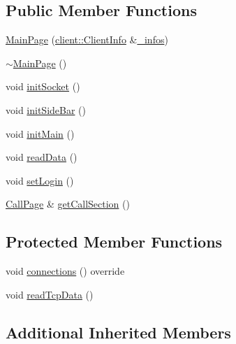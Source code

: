 \subsection*{Public Member Functions}
\begin{DoxyCompactItemize}
\item 
\mbox{\hyperlink{classbabel_1_1client_1_1_main_page_ae98d1ec7f7eecae6cbbed21ffeaa1762}{Main\+Page}} (\mbox{\hyperlink{classbabel_1_1client_1_1_client_info}{client\+::\+Client\+Info}} \&\mbox{\hyperlink{classbabel_1_1client_1_1_a_babel_page_aa2070ebfda878ceff938b8a60e7e2898}{\+\_\+infos}})
\item 
\mbox{\hyperlink{classbabel_1_1client_1_1_main_page_a94e35edc679b094fcfe80246a386c0c0}{$\sim$\+Main\+Page}} ()
\item 
void \mbox{\hyperlink{classbabel_1_1client_1_1_main_page_ac26d6673b35dd999441c4d4e0ac75167}{init\+Socket}} ()
\item 
void \mbox{\hyperlink{classbabel_1_1client_1_1_main_page_a67221fe4867d4ed09de3d57135578fd2}{init\+Side\+Bar}} ()
\item 
void \mbox{\hyperlink{classbabel_1_1client_1_1_main_page_a2470869cdd04299fd5730d2f3238f773}{init\+Main}} ()
\item 
void \mbox{\hyperlink{classbabel_1_1client_1_1_main_page_a4d08b1d3f23a58f937e7bb716317b924}{read\+Data}} ()
\item 
void \mbox{\hyperlink{classbabel_1_1client_1_1_main_page_a04bbc090f594f37b254e2d7d751fbdb9}{set\+Login}} ()
\item 
\mbox{\hyperlink{classbabel_1_1client_1_1_call_page}{Call\+Page}} \& \mbox{\hyperlink{classbabel_1_1client_1_1_main_page_ac15fa7d1c10d493edaf9ddbadf4f45ae}{get\+Call\+Section}} ()
\end{DoxyCompactItemize}
\subsection*{Protected Member Functions}
\begin{DoxyCompactItemize}
\item 
void \mbox{\hyperlink{classbabel_1_1client_1_1_main_page_a4c7d94ab3421e1032ed97dc90787f57a}{connections}} () override
\item 
void \mbox{\hyperlink{classbabel_1_1client_1_1_main_page_ae2447ec4e19e7694afc106ccb52a0d43}{read\+Tcp\+Data}} ()
\end{DoxyCompactItemize}
\subsection*{Additional Inherited Members}


